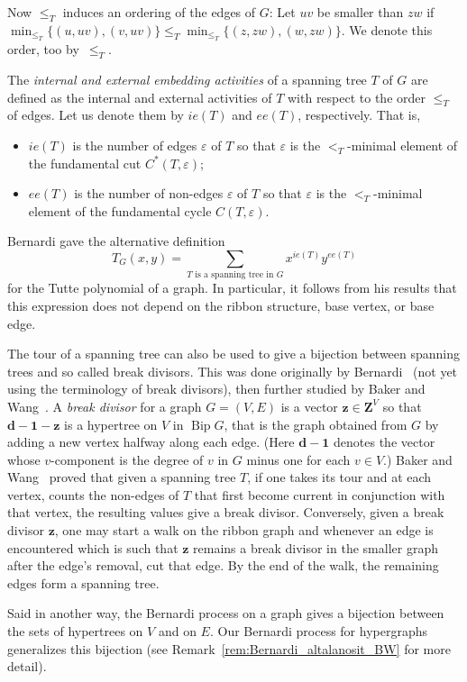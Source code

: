 \documentclass[10pt]{amsart}
\theoremstyle{definition}\newtheorem{defi}[theo]{Definition}
\theoremstyle{remark}\newtheorem{rema}[theo]{Remark}
\newcommand{\Z}{\mathbf{Z}}
\DeclareMathOperator{\bip}{Bip}
\begin{document}
Now $\leq_T$ induces an ordering of the edges of $G$: Let $uv$ be smaller than $zw$ if $\min_{\leq_T}\{(u,uv),(v,uv)\}\leq_T \min_{\leq_T}\{(z,zw),(w,zw)\}$. We denote this order, too by~$\leq_T$.

The \emph{internal and external embedding activities} of a spanning tree $T$ of $G$ are defined as the internal and external activities of $T$ with respect to the order $\leq_T$ of edges. Let us denote them by $ie(T)$ and $ee(T)$, respectively. That is,
\begin{itemize}
\item $ie(T)$ is the number of edges $\varepsilon$ of $T$ so that $\varepsilon$ is the $<_T$-minimal element of the fundamental cut $C^*(T,\varepsilon)$;
\item $ee(T)$ is the number of non-edges $\varepsilon$ of $T$ so that $\varepsilon$ is the $<_T$-minimal element of the fundamental cycle $C(T,\varepsilon)$.
\end{itemize}
Bernardi gave the alternative definition
\[T_G(x,y)=\sum_{T \text{ is a spanning tree in }G} x^{ie(T)}y^{ee(T)}\]
for the Tutte polynomial of a graph. In particular, it follows from his results that this expression does not depend on the ribbon structure, base vertex, or base edge.

The tour of a spanning tree can also be used to give a bijection between spanning trees and so called break divisors. This was done originally by Bernardi~\cite{Bernardi_first} (not yet using the terminology of break divisors), then further studied by Baker and Wang~\cite{Baker-Wang}. A \emph{break divisor} for a graph $G=(V,E)$ is a vector $\mathbf z\in\Z^V$ so that $\mathbf{d}-\mathbf{1}-\mathbf z$ is a hypertree on $V$ in $\bip G$, that is the graph obtained from $G$ by adding a new vertex halfway along each edge. (Here $\mathbf{d}-\mathbf{1}$ denotes the vector whose $v$-component is the degree of $v$ in $G$ minus one for each $v\in V$.) Baker and Wang~\cite{Baker-Wang} proved that given a spanning tree $T$, if one takes its tour and at each vertex, counts the non-edges of $T$ that first become current in conjunction with that vertex, the resulting values give a break divisor. Conversely, given a break divisor $\mathbf z$, one may start a walk on the ribbon graph and whenever an edge is encountered which is such that $\mathbf z$ remains a break divisor in the smaller graph after the edge's removal, cut that edge. By the end of the walk, the remaining edges form a spanning tree.

Said in another way, the Bernardi process on a graph gives a bijection between the sets of hypertrees on $V$ and on $E$. Our Bernardi process for hypergraphs generalizes this bijection (see Remark~\ref{rem:Bernardi_altalanosit_BW} for more detail).
\end{document}
